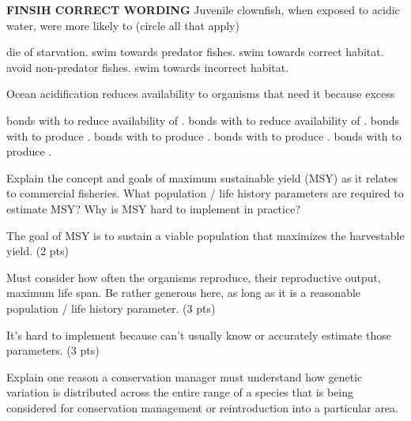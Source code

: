 \question
\textbf{FINSIH CORRECT WORDING}
Juvenile clownfish, when exposed to acidic water, were more likely to (circle all that apply)
\begin{choices}
	\choice die of starvation.
	\correctchoice swim towards predator fishes.
	\choice swim towards correct habitat.
	\correctchoice avoid non-predator fishes.
	\correctchoice swim towards incorrect habitat.
\end{choices}

\question
Ocean acidification reduces  availability to organisms that need it because excess
\begin{choices}
	\choice {} bonds with  to reduce availability of .
	\choice {} bonds with  to reduce availability of .
	\choice {} bonds with  to produce .
	\choice {} bonds with  to produce .
	\correctchoice {} bonds with  to produce .
	\choice {} bonds with  to produce .
\end{choices}



\question[10]
Explain the concept and goals of maximum sustainable yield (MSY) as
it relates to commercial fisheries. What population / life history
parameters are required to estimate MSY? Why is MSY hard to implement in
practice?

\begin{solution}

The goal of MSY is to sustain a viable population that maximizes the harvestable yield. (2 pts)

Must consider how often the organisms reproduce, their reproductive output, maximum life span. Be rather generous here, as long as it is a reasonable population / life history parameter. (3 pts)

It's hard to implement because can't usually know or accurately estimate those parameters. (3 pts)

\end{solution}

\question[5]
Explain one reason a conservation manager must understand how genetic variation is
distributed across the entire range of a species that is being
considered for conservation management or reintroduction into a
particular area.

